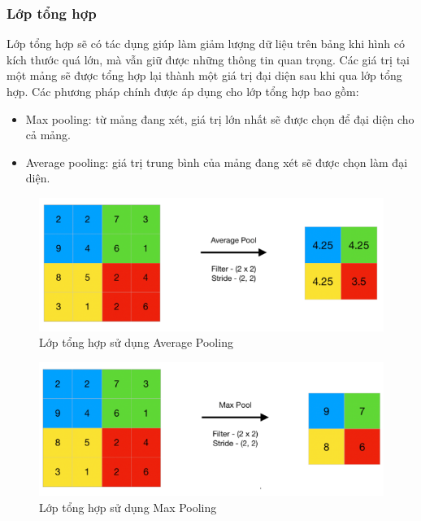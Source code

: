 \subsubsection*{Lớp tổng hợp}
Lớp tổng hợp sẽ có tác dụng giúp làm giảm lượng dữ liệu trên bảng khi hình có kích thước quá lớn, mà vẫn giữ được những thông tin quan trọng. Các giá trị tại một mảng sẽ được tổng hợp lại thành một giá trị đại diện sau khi qua lớp tổng hợp. Các phương pháp chính được áp dụng cho lớp tổng hợp bao gồm:
\begin{itemize}
    \item Max pooling: từ mảng đang xét, giá trị lớn nhất sẽ được chọn để đại diện cho cả mảng.
    \item Average pooling: giá trị trung bình của mảng đang xét sẽ được chọn làm đại diện.
\end{itemize}
\begin{figure}[H]
    \centering
    \includegraphics[scale=0.7]{pics/Chapter3/avgpool.png}
    \caption{Lớp tổng hợp sử dụng Average Pooling \cite{poolingg4g}}
    \label{fig:enter-label}
\end{figure}
\begin{figure}[H]
    \centering
    \includegraphics[scale=0.7]{pics/Chapter3/maxpool.png}
    \caption{Lớp tổng hợp sử dụng Max Pooling  \cite{poolingg4g}}
    \label{fig:enter-label}
\end{figure}
